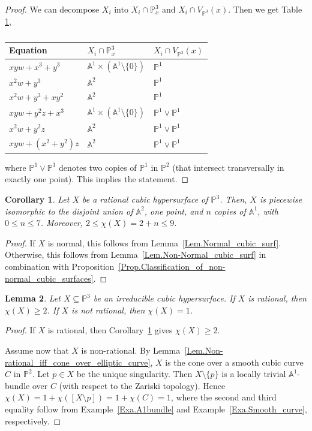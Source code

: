 \documentclass[JEP,XML,SOM,Unicode,NoFloatCountersInSection,published]{cedram}
\newtheorem{lemma}{Lemma}[section]
\newtheorem{corollary}[lemma]{Corollary}
\theoremstyle{definition}
\newcommand\A{{\mathbb A}}\let\AA\A
\newcommand\p{{\mathbb P}}\let\PP\p
\begin{document}
\begin{proof}
We can decompose $X_i$ into $X_i \cap \PP^3_x$ and $X_i \cap V_{\PP^3}(x)$.
Then we get Table \ref{table},
\begin{table}
\caption{}\label{table}
\begin{center}\renewcommand{\arraystretch}{1.2}
\begin{tabular}{l|l|l}
Equation & $X_i \cap \PP^3_x$ & $X_i \cap V_{\PP^3}(x)$ \\
\hline
$xyw + x^3 + y^3$ & $\AA^1 \times (\AA^1 \setminus \{0\})$ & $\PP^1$ \\
$x^2 w + y^3$ & $\AA^2$ & $\PP^1$ \\
$x^2 w + y^3 + xy^2$ & $\AA^2$ & $\PP^1$ \\
$xyw +y^2z + x^3$ & $\AA^1 \times (\AA^1 \setminus \{0\})$ & $\PP^1 \vee \PP^1$ \\
$x^2w+y^2z$ & $\AA^2$ & $\PP^1 \vee \PP^1$ \\
$xyw + (x^2+y^2)z$ & $\AA^2$ & $\PP^1 \vee \PP^1$ \\
\end{tabular}
\end{center}
\end{table}
where $\PP^1 \vee \PP^1$ denotes two copies of $\PP^1$ in $\PP^2$
(that intersect transversally in exactly one point). This implies the statement.
\end{proof}
\begin{corollary}\label{Coro:ChiRatCubic}
Let $X$ be a rational cubic hypersurface of $\p^3$. Then, $X$ is piecewise isomorphic to the disjoint union of $\A^2$, one point, and $n$ copies of $\A^1$, with $0\le n\le 7$. Moreover, $2\le \chi(X)=2+n\le 9$.
\end{corollary}
\begin{proof}
If $X$ is normal, this follows from Lemma~\ref{Lem.Normal_cubic_surf}. Otherwise, this
follows from Lemma~\ref{Lem.Non-Normal_cubic_surf} in combination with Proposition~\ref{Prop.Classification_of_non-normal_cubic_surfaces}.
\end{proof}

\begin{lemma}
\label{Lem.cubic_Euler_char}
Let $X \subseteq \PP^3$ be an irreducible cubic hypersurface.
If $X$ is rational, then $\chi(X)\ge 2$. If $X$ is not rational, then $\chi(X)=1$.
\end{lemma}

\begin{proof}
If $X$ is rational, then Corollary~\ref{Coro:ChiRatCubic} gives $\chi(X)\ge 2$.

Assume now that $X$ is non-rational.
By Lemma~\ref{Lem.Non-rational_iff_cone_over_elliptic_curve},
$X$ is the cone over a smooth cubic curve $C$ in $\PP^2$.
Let $p \in X$ be the unique singularity. Then $X \setminus \{p\}$ is a local\-ly trivial $\AA^1$-bundle over $C$
(with respect to the Zariski topology). Hence $\chi(X) = 1+\chi([X \setminus p]) = 1 + \chi(C) = 1$,
where the second and third equality follow from Example~\ref{Exa.A1bundle}
and Example~\ref{Exa.Smooth_curve}, respectively.
\end{proof}
\end{document}
